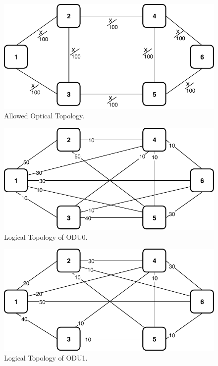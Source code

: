 \begin{figure}[h!]
\centering
\includegraphics[width=12cm]{sdf/ilp/opaque_protection/figures/allowed_optical_topology}
\caption{Allowed Optical Topology.}
\label{allowed_optical_protectionmedium}
\end{figure}

\begin{figure}[h!]
\centering
\includegraphics[width=12cm]{sdf/ilp/opaque_protection/figures/logical_topology_ODU0_medium}
\caption{Logical Topology of ODU0.}
\label{logical_ODU0_protectionmedium}
\end{figure}
\newpage
\begin{figure}[h!]
\centering
\includegraphics[width=12cm]{sdf/ilp/opaque_protection/figures/logical_topology_ODU1_medium}
\caption{Logical Topology of ODU1.}
\label{logical_ODU1_protectionmedium}
\end{figure}

